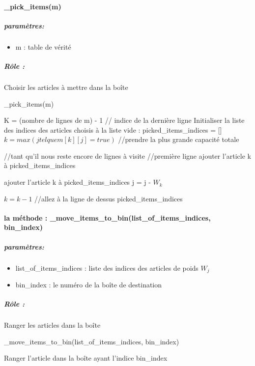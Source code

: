 \documentclass[12pt]{article}
\begin{document}
 \paragraph{\_pick\_items(m)}
\subparagraph{paramètres:}
\begin{itemize}
    \item m : table de vérité
\end{itemize}
\subparagraph{Rôle :}
Choisir les articles à mettre dans la boîte 
\begin{algorithm}[H]
    \caption{\_pick\_items(m)}
    \begin{algorithmic} 
    \STATE K = (nombre de lignes de m) - 1 // indice de la dernière ligne
    \STATE Initialiser la liste des indices des articles choisis à la liste vide : picked\_items\_indices = []
        \STATE $k = max( j tel que m[k][j]=true)$ //prendre la plus grande capacité totale
          
    \ENDIF
        \STATE //tant qu’il nous reste encore de lignes à visite
                \STATE //première ligne
                \STATE ajouter l’article k à picked\_items\_indices
               
            \ELSE
                    \STATE ajouter l’article k à picked\_items\_indices
                    \STATE j = j - $W_k$

                \ENDIF
            \ENDIF
            \STATE  $k = k-1$ //allez à la ligne de dessus      
   \ENDWHILE
    \RETURN picked\_items\_indices
    \end{algorithmic} 
 \end{algorithm}
 \paragraph{la méthode : \_move\_items\_to\_bin(list\_of\_items\_indices, bin\_index)}
 \subparagraph{paramètres:}
 \begin{itemize}
     \item list\_of\_items\_indices : liste des indices des articles de poids $W_j$
     \item bin\_index : le numéro de la boîte de destination
 \end{itemize}
 \subparagraph{Rôle :}
 Ranger les articles dans la boîte 
 \begin{algorithm}[h!]
     \caption{ \_move\_items\_to\_bin(list\_of\_items\_indices, bin\_index)}
     \begin{algorithmic} 
            \STATE Ranger l’article dans la boîte ayant l’indice bin\_index
        \ENDFOR
    
    \end{algorithmic} 
  \end{algorithm}
\end{document}
